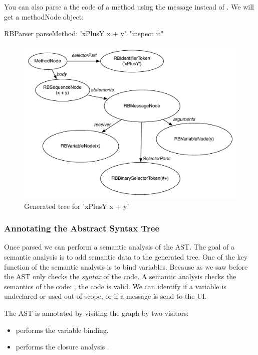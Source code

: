 \documentclass[a4paper,10pt,twoside]{book}
\begin{document}
You can also parse a the code of a method using the message  instead of . We will get a methodNode object:

\begin{code}{}
RBParser parseMethod: 'xPlusY x + y'.
"inspect it"
\end{code}



\begin{figure}[ht]\centering
	\includegraphics[width=0.7\linewidth]{ASTbeforeSemanticAnalysis}
	\caption{Generated tree for  'xPlusY x + y' }
\end{figure}


\subsubsection{Annotating the Abstract Syntax Tree}

Once parsed we can perform a semantic analysis of the AST. The goal of a semantic analysis is to add semantic data to the generated tree. One of the key function of the semantic analysis is to bind variables. 
Because as we saw before the AST only checks the \emph{syntax} of the code. A semantic analysis  checks the semantics of the code: , the code is valid. We can identify if a variable is undeclared or used out of scope, or if a message is send to the UI. 

The AST is annotated by visiting the graph by two visitors:
\begin{itemize}
\item {} performs the variable binding.
\item {} performs the closure analysis .
\end{itemize}
\end{document}
